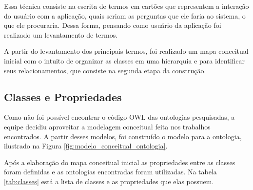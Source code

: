       Essa técnica consiste na escrita de termos em cartões que representem a interação do usuário com a aplicação,
      quais seriam as perguntas que ele faria ao sistema, o que ele procuraria. Dessa forma, pensando como usuário
      da aplicação foi realizado um levantamento de termos.

      A partir do levantamento dos principais termos, foi realizado um mapa conceitual inicial com o intuito
      de organizar as classes em uma hierarquia e para identificar seus relacionamentos, que consiste na segunda
      etapa da construção.

      \subsection{Classes e Propriedades}
      
	  Como não foi possível encontrar o código OWL das ontologias pesquisadas, a equipe decidiu aproveitar a
	  modelagem conceitual feita nos trabalhos encontrados. A partir desses modelos, foi construído o modelo 
	  para a ontologia, ilustrado na Figura \ref{fig:modelo_conceitual_ontologia}.
	  
	  Após a elaboração do mapa conceitual inicial as propriedades entre as classes foram definidas e as ontologias
	  encontradas foram utilizadas. 
	  Na tabela \ref{tab:classes} está a lista de classes e as propriedades que elas possuem.      

